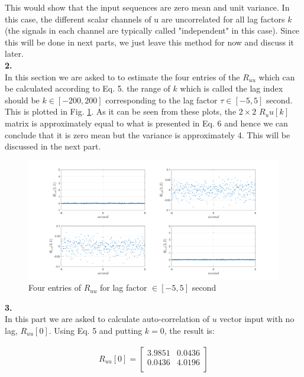 \documentclass[paper=US leter, fontsize=11pt]{scrartcl}
\begin{document}
This would show that the input sequences are zero mean and unit variance. In this case, the different scalar channels of u are uncorrelated for all lag factors $k$ (the signals in each channel are typically called "independent" in this case).
Since this will be done in next parts, we just leave this method for now and discuss it later.\\

\vspace{20pt}
\textbf{2.}\\
In this section we are asked to to estimate the four entries of the $R_{uu}$ which can be calculated according to Eq. 5. the range of $k$ which is called the lag index should be $k \in [-200,200]$ corresponding to the lag factor $\tau \in [-5,5]$ second. This is plotted in Fig. \ref{task32}. As it can be seen from these plots, the $2\times2$ $R_uu[k]$ matrix is approximately equal to what is presented in Eq. 6 and hence we can conclude that it is zero mean but the variance is approximately 4. This will be discussed in the next part.

\begin{figure}[ht!]  
	\centering    
	\includegraphics[scale=0.38,trim={4.5cm 0 0 0},clip]{task32.png}  
	\caption{Four entries of $R_{uu}$ for lag factor $\in [-5,5]$ second}
	\label{task32} 
\end{figure} 

\vspace{20pt}
\textbf{3.}\\
In this part we are asked to calculate auto-correlation of $u$ vector input with no lag, $R_{uu}[0]$. Using Eq. 5 and putting $k=0$, the result is:

\begin{gather*}
R_{uu}[0] = \begin{bmatrix}
3.9851    & 0.0436 \\
0.0436    & 4.0196 \\
\end{bmatrix} \tag{7}
\end{gather*}
\end{document}
